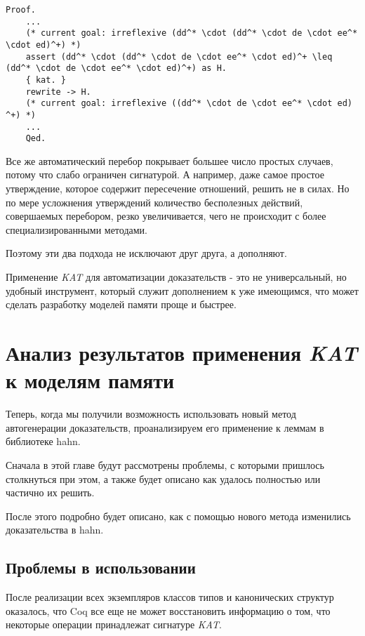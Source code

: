 \documentclass[times
              ,specification
              ,annotation
              ]{itmo-student-thesis}
\begin{document}
    \begin{lstlisting}[float=false, gobble=4,
      caption={Пример доказательства вспомогательного утверждения, необходимого для преобразования, с
        помощью \textit{KAT}}, label={lst:arewrite}]
    Proof.
    ...
    (* current goal: irreflexive (dd^* \cdot (dd^* \cdot de \cdot ee^* \cdot ed)^+) *)
    assert (dd^* \cdot (dd^* \cdot de \cdot ee^* \cdot ed)^+ \leq (dd^* \cdot de \cdot ee^* \cdot ed)^+) as H.
    { kat. }
    rewrite -> H.
    (* current goal: irreflexive ((dd^* \cdot de \cdot ee^* \cdot ed) ^+) *)
    ...
    Qed.
    \end{lstlisting}

    Все же автоматический перебор покрывает большее число простых случаев, потому что слабо ограничен сигнатурой.
    А например, даже самое простое утверждение, которое содержит пересечение отношений, 
    решить не в силах. Но по мере усложнения утверждений количество бесполезных действий, совершаемых
    перебором, резко увеличивается, чего не происходит с более специализированными методами.
    
    Поэтому эти два подхода не исключают друг друга, а дополняют.

  \chapterconclusion
    Применение \textit{KAT} для автоматизации доказательств - это не универсальный, но удобный
    инструмент, который служит дополнением к уже имеющимся, что может сделать  разработку моделей
    памяти проще и быстрее.

\chapter{Анализ результатов применения \textit{KAT} к моделям памяти}\label{chapter:3}

  Теперь, когда мы получили возможность использовать новый метод автогенерации доказательств, проанализируем его
  применение к леммам в библиотеке hahn.

  Сначала в этой главе будут рассмотрены проблемы, с которыми пришлось столкнуться при этом, а также
  будет описано как удалось полностью или частично их решить.

  После этого подробно будет описано, как с помощью нового метода изменились доказательства в hahn.

  \section{Проблемы в использовании }
    После реализации всех экземпляров классов типов и канонических структур оказалось, что Coq все еще
    не может восстановить информацию о том, что некоторые операции принадлежат сигнатуре \textit{KAT}.
\end{document}
